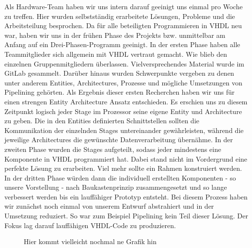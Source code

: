 \documentclass[paper=a4,fontsize=12pt,twocolumn]{scrreprt}
\begin{document}
Als Hardware-Team haben wir uns intern darauf geeinigt uns einmal pro Woche zu treffen.
Hier wurden selbstständig erarbeitete Lösungen, Probleme und die Arbeitsteilung besprochen.
Da für alle beteiligten Programmieren in VHDL neu war, haben wir uns in der frühen Phase des Projekts bzw. unmittelbar am Anfang auf ein Drei-Phasen-Programm geeinigt.
In der ersten Phase haben alle Teammitglieder sich allgemein mit VHDL vertraut gemacht.
Wie blieb den einzelnen Gruppenmitgliedern überlassen.
Vielversprechendes Material wurde im GitLab gesammelt.
Darüber hinaus wurden Schwerpunkte vergeben zu denen unter anderem Entities, Architectures, Prozesse und mögliche Umsetzungen von Pipelining gehörten.
Als Ergebnis dieser ersten Recherchen haben wir uns für einen strengen Entity Architecture Ansatz entschieden.
Es erschien uns zu diesem Zeitpunkt logisch jeder Stage im Prozessor seine eigene Entity und Architecture zu geben.
Die in den Entities definierten Schnittstellen sollten die Kommunikation der einzelnden Stages untereinander gewährleisten, während die jeweilige Architectures die gewünschte Datenverarbeitung übernähme.
In der zweiten Phase wurden die Stages aufgeteilt, sodass jeder mindestens eine Komponente in VHDL programmiert hat.
Dabei stand nicht im Vordergrund eine perfekte Lösung zu erarbeiten.
Viel mehr sollte ein Rahmen konstruiert werden.
In der dritten Phase würden dann die individuell erstellten Komponenten - so unsere Vorstellung - nach Baukastenprinzip zusammengesetzt und so lange verbessert werden bis ein lauffähiger Prototyp entsteht.
Bei diesem Prozess haben wir zunächst noch einmal von unserem Entwurf abstrahiert und in der Umsetzung reduziert.
So war zum Beispiel Pipelining kein Teil dieser Lösung.
Der Fokus lag darauf lauffähigen VHDL-Code zu produzieren.

\begin{figure}
    \centering
    \caption{Hier kommt vielleicht nochmal ne Grafik hin}
    \label{fig:my_label}
\end{figure}
\end{document}
